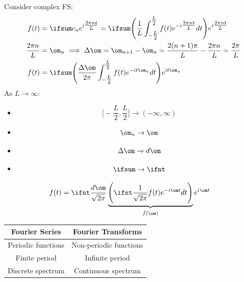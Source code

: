 \documentclass[a4paper, 11pt, normalem]{report}
\begin{document}
Consider complex FS:
\begin{align*}
    f(t) &= \ifsum c_n e^{i\tfrac{2\pi nt}{L}} = \ifsum \Bigg(\frac{1}{L}\int_{-\tfrac{L}{2}}^{\tfrac{L}{2}} f(t)e^{-i\tfrac{2\pi nt}{L}}dt \Bigg)e^{i\tfrac{2\pi nt}{L}} \\
    \frac{2\pi n}{L} &= \om_n \implies \Delta \om = \om_{n + 1} - \om_n = \frac{2(n + 1)\pi}{L} - \frac{2\pi n}{L} = \frac{2\pi}{L} \\
    f(t) &= \ifsum \Bigg(\frac{\Delta \om}{2\pi} \int_{-\tfrac{L}{2}}^{\tfrac{L}{2}} f(t)e^{-it\om_n}dt\Bigg) e^{it\om_n}
\end{align*}
As $L \to \infty$:
\begin{itemize}
    \item   \begin{equation*}
                \Big[-\frac{L}{2},\frac{L}{2}\Big] \to (-\infty, \infty)
            \end{equation*}
    \item   \begin{equation*}
                \om_n \to \om
            \end{equation*}
    \item   \begin{equation*}
                \Delta \om \to d\om
            \end{equation*}
    \item   \begin{equation*}
                \ifsum \to \ifnt
            \end{equation*}
\end{itemize}
\begin{align*}
    f(t) &= \ifnt \frac{d\om}{\sqrt{2\pi}}\underbrace{\Bigg(\ifnt \frac{1}{\sqrt{2\pi}} f(t)e^{-i\om t} dt\Bigg)}_{\hat{f}(\om)} e^{i\om t}
\end{align*}
\begin{table}[H]
    \centering
    \begin{tabular}{|c|c|}
        \hline
            Fourier Series &     Fourier Transforms \\
        \hline
        Periodic functions & Non-periodic functions \\
             Finite period &        Infinite period \\
         Discrete spectrum &    Continuous spectrum \\
        \hline
    \end{tabular}
\end{table}
\end{document}
